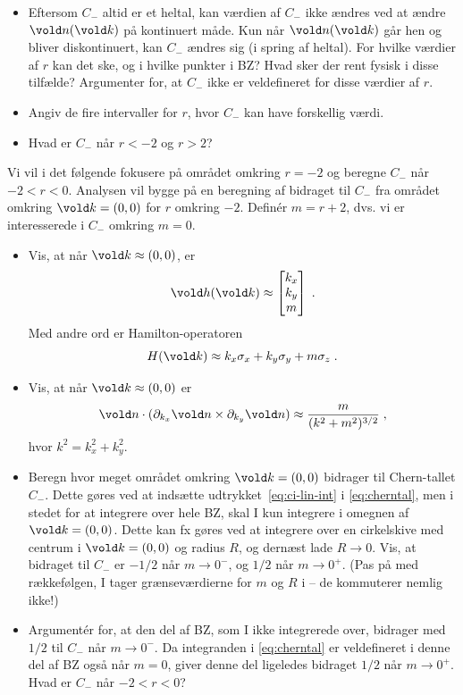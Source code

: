 \documentclass[11pt, a4paper]{article}
\let\v\vold
\newcommand{\v}[1]{{\bf{#1}}}
\begin{document}
\begin{itemize}
\item Eftersom $C_-$ altid er et heltal, kan værdien af $C_-$ ikke
  ændres ved at ændre $\v n (\v k)$ på kontinuert måde. Kun når $\v n
  (\v k)$ går hen og bliver diskontinuert, kan $C_-$ ændres sig (i
  spring af heltal). For hvilke værdier af $r$ kan det ske, og i
  hvilke punkter i BZ? Hvad sker der rent fysisk i disse tilfælde?
  Argumenter for, at $C_-$ ikke er veldefineret for disse værdier af
  $r$.
\item Angiv de fire intervaller for $r$, hvor $C_-$ kan have
  forskellig værdi.
\item Hvad er $C_-$ når $r < -2$ og $r > 2$?
\end{itemize}

Vi vil i det følgende fokusere på området omkring $r=-2$ og beregne
$C_-$ når $-2 < r < 0$. Analysen vil bygge på en beregning af bidraget
til $C_-$ fra området omkring $\v k = (0,0)$ for $r$ omkring
$-2$. Definér $m = r + 2$, dvs. vi er interesserede i $C_-$ omkring
$m=0$.

\begin{itemize}
\item Vis, at når $\v k \approx (0,0)$, er
  \[
  \v h (\v k) \approx 
  \begin{bmatrix}
    k_x \\ k_y \\ m
  \end{bmatrix}
  \; .
  \]
  Med andre ord er Hamilton-operatoren
  \begin{equation}
    \label{eq:ci-dirac}
    H(\v k ) \approx k_x \sigma_x + k_y \sigma_y + m \sigma_z \; .
  \end{equation}
\item Vis, at når $\v k \approx (0,0)$ er
  \begin{equation}
    \label{eq:ci-lin-int}
    \v n \cdot (\partial_{k_x} \v n \times \partial_{k_y} \v n)
    \approx \frac{m}{(k^2 + m^2)^{3/2}} \; ,
  \end{equation}
  hvor $k^2 = k_x^2 + k_y^2$.
\item Beregn hvor meget området omkring $\v k = (0,0)$ bidrager til
  Chern-tallet $C_-$. Dette gøres ved at indsætte
  udtrykket~\eqref{eq:ci-lin-int} i \eqref{eq:cherntal}, men i stedet
  for at integrere over hele BZ, skal I kun integrere i omegnen af $\v
  k = (0,0)$. Dette kan fx gøres ved at integrere over en cirkelskive
  med centrum i $\v k = (0,0)$ og radius $R$, og dernæst lade $R
  \rightarrow 0$. Vis, at bidraget til $C_-$ er $-1/2$ når $m
  \rightarrow 0^-$, og $1/2$ når $m \rightarrow 0^+$. (Pas på med
  rækkefølgen, I tager grænseværdierne for $m$ og $R$ i -- de
  kommuterer nemlig ikke!)
\item Argumentér for, at den del af BZ, som I ikke integrerede over,
  bidrager med $1/2$ til $C_-$ når $m \rightarrow 0^-$. Da integranden
  i \eqref{eq:cherntal} er veldefineret i denne del af BZ også når
  $m=0$, giver denne del ligeledes bidraget $1/2$ når $m \rightarrow
  0^+$. Hvad er $C_-$ når $-2 < r < 0$?
\end{itemize}
\end{document}
